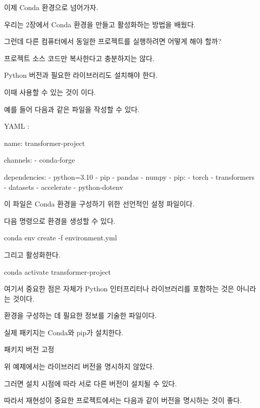 이제 Conda 환경으로 넘어가자.

우리는 2장에서 Conda 환경을 만들고 활성화하는 방법을 배웠다.

그런데 다른 컴퓨터에서 동일한 프로젝트를 실행하려면 어떻게 해야 할까?

프로젝트 소스 코드만 복사한다고 충분하지는 않다.

Python 버전과 필요한 라이브러리도 설치해야 한다.

이때 사용할 수 있는 것이 이다.

예를 들어 다음과 같은 파일을 작성할 수 있다.

YAML :

\begin{dhkzsh}
name: transformer-project

channels:
  - conda-forge

dependencies:
  - python=3.10
  - pip
  - pandas
  - numpy
  - pip:
      - torch
      - transformers
      - datasets
      - accelerate
      - python-dotenv
\end{dhkzsh}

이 파일은 Conda 환경을 구성하기 위한 선언적인 설정 파일이다.

다음 명령으로 환경을 생성할 수 있다.

\begin{dhkzsh}
conda env create -f environment.yml
\end{dhkzsh}

그리고 활성화한다.

\begin{dhkzsh}
conda activate transformer-project
\end{dhkzsh}

여기서 중요한 점은  자체가 Python 인터프리터나 라이브러리를 포함하는 것은 아니라는 것이다.

환경을 구성하는 데 필요한 정보를 기술한 파일이다.

실제 패키지는 Conda와 pip가 설치한다.

\begin{dhknote}
\begin{dhksmry}[centered]
패키지 버전 고정
\end{dhksmry}
\end{dhknote}

위 예제에서는 라이브러리 버전을 명시하지 않았다.

그러면 설치 시점에 따라 서로 다른 버전이 설치될 수 있다.

따라서 재현성이 중요한 프로젝트에서는 다음과 같이 버전을 명시하는 것이 좋다.

